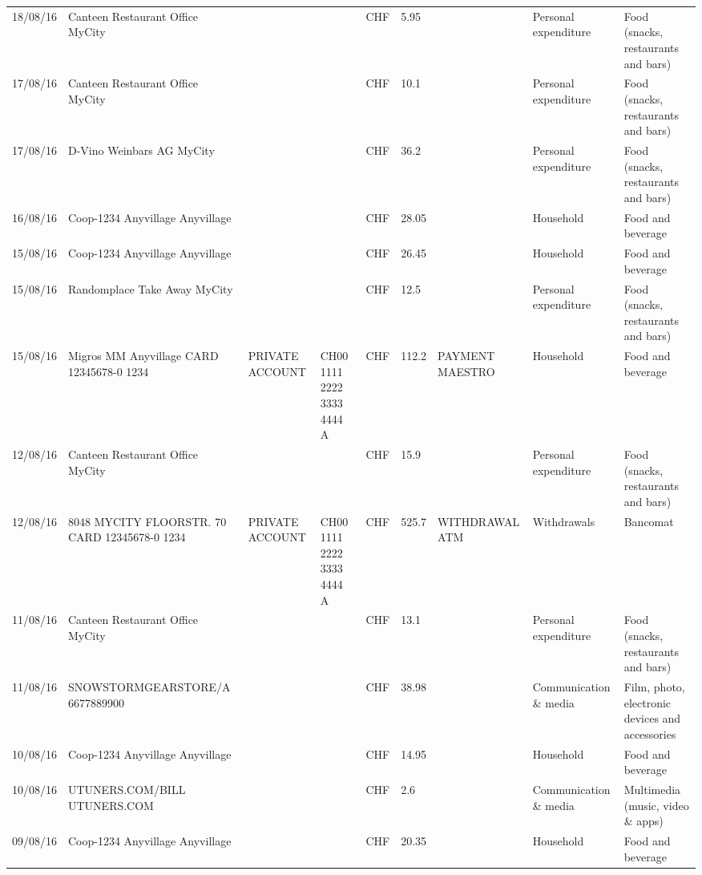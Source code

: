 \begin{landscape}
\begin{table}[t]
\begin{center}
\begin{tabular}{lllllllll}
		18/08/16 & Canteen Restaurant Office      MyCity &       &       & CHF   & 5.95  &       & Personal expenditure & Food (snacks, restaurants and bars) \\
		17/08/16 & Canteen Restaurant Office      MyCity &       &       & CHF   & 10.1  &       & Personal expenditure & Food (snacks, restaurants and bars) \\
		17/08/16 & D-Vino Weinbars AG       MyCity &       &       & CHF   & 36.2  &       & Personal expenditure & Food (snacks, restaurants and bars) \\
		16/08/16 & Coop-1234 Anyvillage    Anyvillage &       &       & CHF   & 28.05 &       & Household & Food and beverage \\
		15/08/16 & Coop-1234 Anyvillage    Anyvillage &       &       & CHF   & 26.45 &       & Household & Food and beverage \\
		15/08/16 & Randomplace Take Away     MyCity &       &       & CHF   & 12.5  &       & Personal expenditure & Food (snacks, restaurants and bars) \\
		15/08/16 & Migros MM Anyvillage CARD 12345678-0 1234 & PRIVATE ACCOUNT & CH00 1111 2222 3333 4444 A & CHF   & 112.2 & PAYMENT MAESTRO & Household & Food and beverage \\
		12/08/16 & Canteen Restaurant Office      MyCity &       &       & CHF   & 15.9  &       & Personal expenditure & Food (snacks, restaurants and bars) \\
		12/08/16 & 8048 MYCITY FLOORSTR. 70 CARD 12345678-0 1234 & PRIVATE ACCOUNT & CH00 1111 2222 3333 4444 A & CHF   & 525.7 & WITHDRAWAL ATM & Withdrawals & Bancomat \\
		11/08/16 & Canteen Restaurant Office      MyCity &       &       & CHF   & 13.1  &       & Personal expenditure & Food (snacks, restaurants and bars) \\
		11/08/16 & SNOWSTORMGEARSTORE/A      6677889900 &       &       & CHF   & 38.98 &       & Communication \& media & Film, photo, electronic devices and accessories \\
		10/08/16 & Coop-1234 Anyvillage    Anyvillage &       &       & CHF   & 14.95 &       & Household & Food and beverage \\
		10/08/16 & UTUNERS.COM/BILL          UTUNERS.COM &       &       & CHF   & 2.6   &       & Communication \& media & Multimedia (music, video \& apps) \\
		09/08/16 & Coop-1234 Anyvillage    Anyvillage &       &       & CHF   & 20.35 &       & Household & Food and beverage \\

\end{tabular}
\end{center}
\end{table}
\end{landscape}
